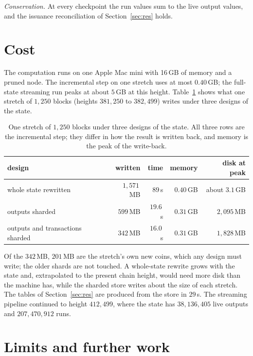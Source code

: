 \documentclass[11pt]{amsart}
\begin{document}
\emph{Conservation.} At every checkpoint the run values sum to the live output values, and the issuance reconciliation of Section~\ref{sec:res} holds.

\section{Cost}\label{sec:cost}

The computation runs on one Apple Mac mini with 16\,GB of memory and a pruned node. The incremental step on one stretch uses at most $0.40$\,GB; the full-state streaming run peaks at about $5$\,GB at this height. Table~\ref{tab:cost} shows what one stretch of $1{,}250$ blocks (heights $381{,}250$ to $382{,}499$) writes under three designs of the state.

\begin{table}[tbp]
\centering
\begin{tabular}{lrrrr}
\toprule
design & written & time & memory & disk at peak \\
\midrule
whole state rewritten & $1{,}571$\,MB & $89$\,s & $0.40$\,GB & about $3.1$\,GB \\
outputs sharded & $599$\,MB & $19.6$\,s & $0.31$\,GB & $2{,}095$\,MB \\
outputs and transactions sharded & $342$\,MB & $16.0$\,s & $0.31$\,GB & $1{,}828$\,MB \\
\bottomrule
\end{tabular}
\medskip
\caption{One stretch of $1{,}250$ blocks under three designs of the state. All three rows are the incremental step; they differ in how the result is written back, and memory is the peak of the write-back.}
\label{tab:cost}
\end{table}

Of the $342$\,MB, $201$\,MB are the stretch's own new coins, which any design must write; the older shards are not touched. A whole-state rewrite grows with the state and, extrapolated to the present chain height, would need more disk than the machine has, while the sharded store writes about the size of each stretch. The tables of Section~\ref{sec:res} are produced from the store in $29$\,s. The streaming pipeline continued to height $412{,}499$, where the state has $38{,}136{,}405$ live outputs and $207{,}470{,}912$ runs.

\section{Limits and further work}
\end{document}
